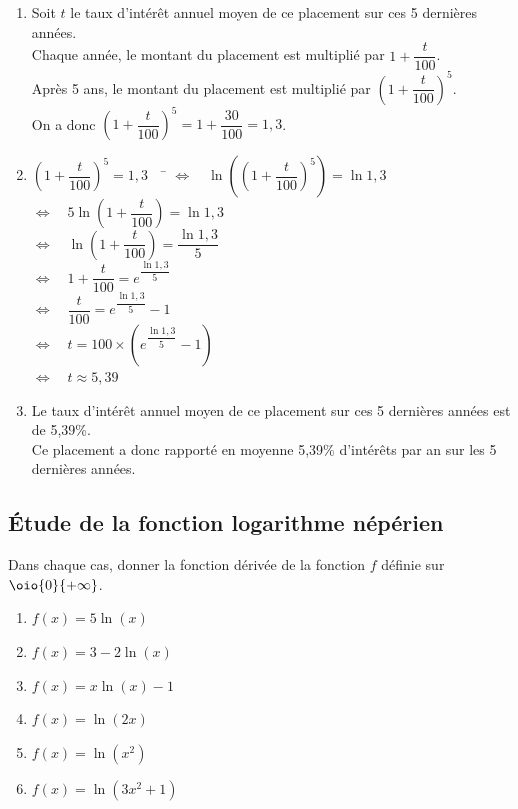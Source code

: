 \documentclass[a4paper,11pt,exos]{nsi} %
\begin{document}
\textcolor{UGLiBlue}{
    \begin{enumerate}
        \item Soit $t$ le taux d'intérêt annuel moyen de ce placement sur ces 5 dernières années.\\
        Chaque année, le montant du placement est multiplié par $1+\dfrac{t}{100}$.\\
        Après 5 ans, le montant du placement est multiplié par $\left(1+\dfrac{t}{100}\right)^5$.\\
        On a donc $\left(1+\dfrac{t}{100}\right)^5=1+\dfrac{30}{100}=1,3$.
        \item \begin{tabbing}
            $\left(1+\dfrac{t}{100}\right)^5=1,3\quad$ \= $\iff \quad \ln\left(\left(1+\dfrac{t}{100}\right)^5\right)=\ln 1,3$\\
            \> $\iff \quad 5\ln\left(1+\dfrac{t}{100}\right)=\ln 1,3$\\
            \> $\iff \quad \ln\left(1+\dfrac{t}{100}\right)=\dfrac{\ln 1,3}{5}$\\
            \> $\iff \quad 1+\dfrac{t}{100}=e^{\dfrac{\ln 1,3}{5}}$\\
            \> $\iff \quad \dfrac{t}{100}=e^{\dfrac{\ln 1,3}{5}}-1$\\
            \> $\iff \quad t=100\times\left(e^{\dfrac{\ln 1,3}{5}}-1\right)$\\
            \> $\iff \quad t\approx 5,39$
        \end{tabbing}
        \item Le taux d'intérêt annuel moyen de ce placement sur ces 5 dernières années est de 5,39\%.\\
        Ce placement a donc rapporté en moyenne 5,39\% d'intérêts par an sur les 5 dernières années.
    \end{enumerate}
}

\subsection*{Étude de la fonction logarithme népérien}

\exo{}
Dans chaque cas, donner la fonction dérivée de la fonction $f$ définie sur $\oio{0}{+\infty}$.
\begin{multicols}{3}
    \begin{enumerate}
        \item $f(x)=5\ln(x)$
        \item $f(x)=3-2\ln(x)$
        \item $f(x)=x\ln\left(x\right)-1$
        \item $f(x)=\ln(2x)$
        \item $f(x)=\ln\left(x^2\right)$
        \item $f(x)=\ln\left(3x^2+1\right)$
    \end{enumerate}
\end{multicols}
\end{document}
